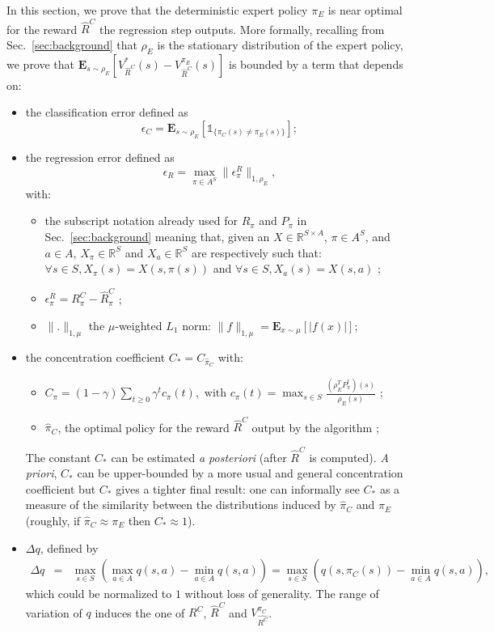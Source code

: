 \documentclass[smallextended]{svjour3}
\newcommand{\E}{\mathbf{E}}
\begin{document}
In this section, we prove that the deterministic expert policy $\pi_E$ is near optimal for the reward $\hat{R}^C$ the regression step outputs.
More formally, recalling from Sec.~\ref{sec:background} that $\rho_E$ is the stationary distribution of the expert policy, we prove that $\E_{s\sim\rho_E}[V^*_{\hat{R}^C}(s)-V^{\pi_E}_{\hat{R}^C}(s)]$ is bounded by a term that depends on:
\begin{itemize}
  \item the classification error defined as
\begin{equation}  
\epsilon_C=\E_{s\sim\rho_E}[\mathds{1}_{\{\pi_C(s)\neq\pi_E(s)\}}];
\end{equation}
\item the regression error defined as 
  \begin{equation}
    \epsilon_R=\max_{\pi\in A^S}\|\epsilon_\pi^R\|_{1,\rho_E},
  \end{equation}
  with:
  \begin{itemize}
  \item the subscript notation already used for $R_\pi$ and $P_\pi$ in Sec.~\ref{sec:background} meaning that, given an $X\in\mathbb{R}^{S\times A}$, $\pi\in A^S$, and $a\in A$,  $X_\pi\in\mathbb{R}^S$ and $X_a\in\mathbb{R}^S$ are respectively such that: $\forall s\in S, X_\pi(s)=X(s,\pi(s))$ and $\forall s\in S, X_a(s)=X(s,a)$ ;
  \item $\epsilon^R_\pi=R^C_\pi-\hat{R}^C_\pi$ ;
  \item $\|.\|_{1,\mu}$ the $\mu$-weighted $L_1$ norm: $\|f\|_{1,\mu} = \E_{x\sim \mu}[|f(x)|]$;
  \end{itemize}
\item the concentration coefficient $C_* = C_{\hat \pi_C}$ with:
  \begin{itemize}
  \item $C_{\pi}=(1-\gamma)\sum_{t\geq0}\gamma^tc_{\pi}(t), \text{ with } c_{\pi}(t)=\max_{s\in S}\frac{(\rho_E^TP^t_\pi)(s)}{\rho_E(s)}$ ;
  \item $\hat \pi_C$, the optimal policy for the reward $\hat R^C$ output by the algorithm ;
  \end{itemize}
  The constant $C_*$ can be estimated \emph{a posteriori} (after $\hat{R}^C$ is computed). {\it A priori}, $C_*$ can be upper-bounded by a more usual and general concentration coefficient but $C_*$ gives a tighter final result: one can informally see $C_*$ as a measure of the similarity between the distributions induced by $\hat\pi_C$ and $\pi_E$ (roughly, if $\hat{\pi}_C\approx\pi_E$ then $C_* \approx 1$).
\item $\Delta q$, defined by 
  \begin{eqnarray}
    \Delta q &= &\max_{s\in S}(\max_{a\in A}q(s,a)-\min_{a\in A}q(s,a))=\max_{s\in S}(q(s,\pi_C(s))-\min_{a\in A}q(s,a)),
    \end{eqnarray} which could be normalized to $1$ without loss of generality. The range of variation of $q$ induces the one of $R^C$, $\hat{R}^C$ and $V^{\pi_C}_{\hat{R^C}}$.
  \end{itemize}
\end{document}

